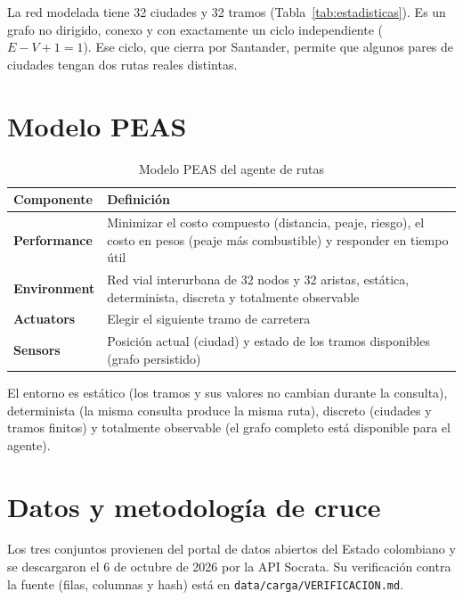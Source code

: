 \documentclass[12pt,a4paper]{article}
\begin{document}
La red modelada tiene 32 ciudades y 32 tramos (Tabla~\ref{tab:estadisticas}).
Es un grafo no dirigido, conexo y con exactamente un ciclo independiente
($E-V+1=1$). Ese ciclo, que cierra por Santander, permite que algunos pares
de ciudades tengan dos rutas reales distintas.


\section{Modelo PEAS}

\begin{table}[H]
\centering
\caption{Modelo PEAS del agente de rutas}
\label{tab:peas}
\renewcommand{\arraystretch}{1.2}
\begin{tabular}{|l|>{\raggedright\arraybackslash}p{10cm}|}
\hline
\rowcolor{gray!20} \textbf{Componente} & \textbf{Definición} \\
\hline
\textbf{Performance} & Minimizar el costo compuesto (distancia, peaje, riesgo), el costo en pesos (peaje más combustible) y responder en tiempo útil \\
\hline
\textbf{Environment} & Red vial interurbana de 32 nodos y 32 aristas, estática, determinista, discreta y totalmente observable \\
\hline
\textbf{Actuators} & Elegir el siguiente tramo de carretera \\
\hline
\textbf{Sensors} & Posición actual (ciudad) y estado de los tramos disponibles (grafo persistido) \\
\hline
\end{tabular}
\end{table}

El entorno es estático (los tramos y sus valores no cambian durante la
consulta), determinista (la misma consulta produce la misma ruta), discreto
(ciudades y tramos finitos) y totalmente observable (el grafo completo está
disponible para el agente).

\section{Datos y metodología de cruce}

Los tres conjuntos provienen del portal de datos abiertos del Estado
colombiano y se descargaron el 6 de octubre de 2026 por la API Socrata. Su
verificación contra la fuente (filas, columnas y hash) está en
\texttt{data/carga/VERIFICACION.md}.
\end{document}
